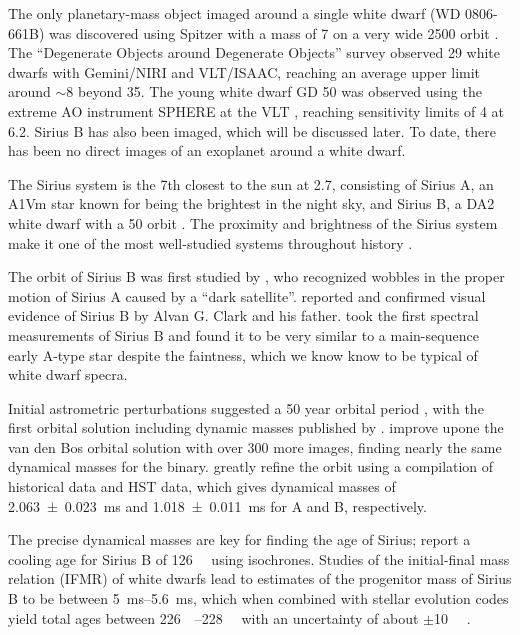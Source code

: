 \documentclass[twocolumn]{aastex631}
\begin{document}
The only planetary-mass object imaged around a single white dwarf (WD 0806-661B) was discovered using Spitzer with a mass of \qty{7}{\mj} on a very wide \qty{2500}{\au} orbit \citep{luhman_discovery_2011}. The ``Degenerate Objects around Degenerate Objects'' survey \citep[DODO;][]{hogan_dodo_2009} observed 29 white dwarfs with Gemini/NIRI and VLT/ISAAC, reaching an average upper limit around $\sim$\qty{8}{\mj} beyond \qty{35}{\au}. The young white dwarf GD 50 was observed using the extreme AO instrument SPHERE at the VLT \citep{xu_extreme-ao_2015}, reaching sensitivity limits of \qty{4}{\mj} at \qty{6.2}{\au}. Sirius B has also been imaged, which will be discussed later. To date, there has been no direct images of an exoplanet around a white dwarf.

The Sirius system is the 7th closest to the sun at \qty{2.7}{\parsec}, consisting of Sirius A, an A1Vm star known for being the brightest in the night sky, and Sirius B, a DA2 white dwarf with a \qty{50}{\year} orbit \citep{bond_sirius_2017,collaboration_gaia_2018}. The proximity and brightness of the Sirius system make it one of the most well-studied systems throughout history \citep[see][]{wesemael_sirius_1982}.

The orbit of Sirius B was first studied by \citet{bessel_variations_1844}, who recognized wobbles in the proper motion of Sirius A caused by a ``dark satellite''. \citet{bond_companion_1862} reported and confirmed visual evidence of Sirius B by Alvan G. Clark and his father. \citet{adams_spectrum_1915} took the first spectral measurements of Sirius B and found it to be very similar to a main-sequence early A-type star despite the faintness, which we know know to be typical of white dwarf specra. 

Initial astrometric perturbations suggested a 50 year orbital period \citep{auwers_orbit_1864}, with the first orbital solution including dynamic masses published by \citet{van_den_bos_orbit_1960}. \citet{gatewood_study_1978} improve upone the van den Bos orbital solution with over 300 more images, finding nearly the same dynamical masses for the binary. \citet{bond_sirius_2017} greatly refine the orbit using a compilation of historical data and HST data, which gives dynamical masses of \qty{2.063+-0.023}{\ms} and \qty{1.018+-0.011}{\ms} for A and B, respectively. 

The precise dynamical masses are key for finding the age of Sirius; \citet{bond_sirius_2017} report a cooling age for Sirius B of \qty{126}{\mega\year} using isochrones. Studies of the initial-final mass relation (IFMR) of white dwarfs \citep{cummings_two_2016} lead to estimates of the progenitor mass of Sirius B to be between \qtyrange{5}{5.6}{\ms}, which when combined with stellar evolution codes yield total ages between \qtyrange{226}{228}{\mega\year} with an uncertainty of about $\pm$\qty{10}{\mega\year} \citep{bond_sirius_2017}.
\end{document}
